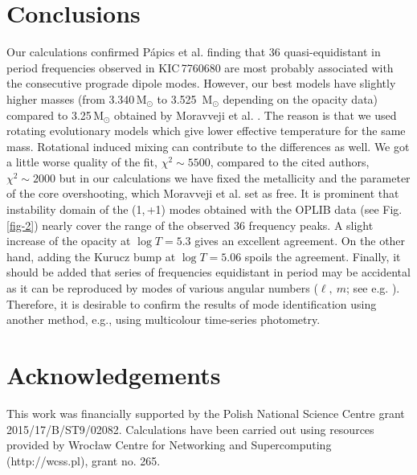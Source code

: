 \documentclass[epj,twocolumn]{webofc}
\begin{document}
\section{Conclusions}
\label{sec-con}
Our calculations confirmed P{\'a}pics et al. \citep{Papics2015} finding that 36
quasi-equidistant in period frequencies observed in KIC\,7760680 are most probably associated with the consecutive
prograde dipole modes. However, our best models have slightly higher masses
(from 3.340$\,\mathrm{M_\odot}$ to 3.525 $\,\mathrm{M_\odot}$ depending on the opacity data)
compared to 3.25$\,\mathrm{M_\odot}$ obtained by Moravveji et al. \citep{Moravveji2016}. The reason is that
we used rotating evolutionary models which give lower effective temperature for the same mass.
Rotational induced mixing can contribute to the differences as well. We got a little worse quality of the fit,
$\chi^{2} \sim 5500$, compared to the cited authors,
$\chi^{2} \sim 2000$ but in our calculations we have fixed the metallicity and the parameter of the core overshooting, which Moravveji et al. \citep{Moravveji2016} set as free.
It is prominent that instability domain of the (1,\,+1) modes obtained with the OPLIB data (see Fig.\,\ref{fig-2})
nearly cover the range of the observed 36 frequency peaks.
A slight increase of the opacity at $\log T=5.3$ gives an excellent agreement.
On the other hand, adding the Kurucz bump at $\log T=5.06$ spoils the agreement.
Finally, it should be added that  series of frequencies equidistant in period may be accidental as
it can be reproduced by modes of various angular numbers ($\ell,~m$; see e.g. \cite{Szewczuk2014}).
Therefore, it is desirable to confirm the results of mode identification
using another method, e.g., using multicolour time-series photometry.





\section*{\footnotesize Acknowledgements}


\footnotesize
This work was financially supported by the Polish National Science Centre grant 2015/17/B/ST9/02082.
Calculations have been carried out using
resources provided by Wroc{\l}aw Centre for Networking and Supercomputing (http://wcss.pl), grant no. 265.\\
\end{document}

